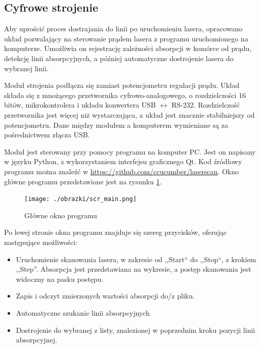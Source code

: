 \documentclass[a4paper,10pt]{article}
\begin{document}
\subsection{Cyfrowe strojenie}

Aby uprościć proces dostrajania do linii po uruchomieniu lasera, opracowano układ pozwalający na sterowanie prądem lasera z programu uruchomionego na komputerze.
Umożliwia on rejestrację zależności absorpcji w komórce od prądu, detekcję linii absorpcyjnych, a później automatyczne dostrojenie lasera do wybranej linii.

Moduł strojenia podłącza się zamiast potencjometru regulacji prądu. Układ składa się z mnożącego przetwornika cyfrowo-analogowego, o rozdzielczości 16 bitów, mikrokontrolera i układu konwertera USB $\leftrightarrow$ RS-232. Rozdzielczość przetwornika jest więcej niż wystarczająca, a układ jest znacznie stabilniejszy od potencjometru. Dane między modułem a komputerem wymieniane są za pośrednictwem złącza USB.

Moduł jest sterowany przy pomocy programu na komputer PC. Jest on napisany w języku Python, z wykorzystaniem interfejsu graficznego Qt. Kod źródłowy programu można znaleźć w \url{https://github.com/ccucumber/laserscan}. Okno główne programu przedstawione jest na rysunku \ref{scr-main}.

\begin{figure}
\begin{center}
 \texttt{[image: ./obrazki/scr\_main.png]}
\end{center}
\caption{Główne okno programu}
\label{scr-main}
\end{figure}


Po lewej stronie okna programu znajduje się szereg przycisków, oferując następujące możliwości:

\begin{itemize}
 \item Uruchomienie skanowania lasera, w zakresie od ,,Start`` do ,,Stop``, z krokiem ,,Step''. Absorpcja jest przedstawiana na wykresie, a postęp skanowania jest widoczny na pasku postępu.
 \item Zapis i odczyt zmierzonych wartości absorpcji do/z pliku.
 \item Automatyczne szukanie linii absorpcyjnych
 \item Dostrojenie do wybranej z listy, znalezionej w poprzednim kroku pozycji linii absorpcyjnej.
\end{itemize}
\end{document}
